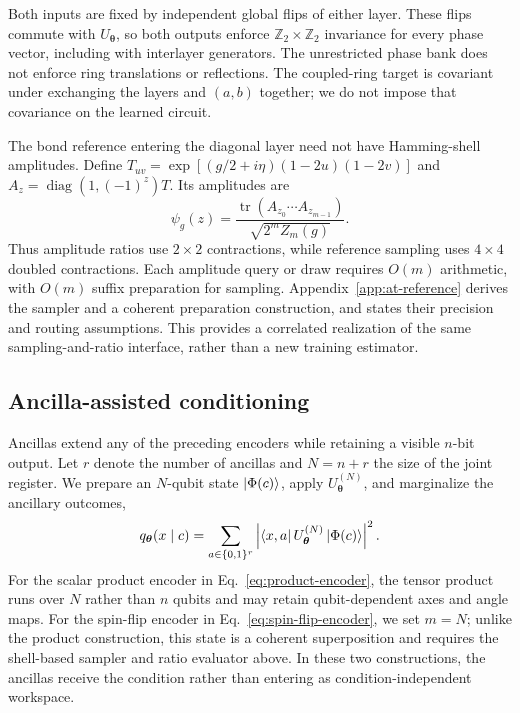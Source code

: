 \documentclass[pra,aps,10pt,twocolumn,floatfix,superscriptaddress,
notitlepage,longbibliography]{revtex4-2}
\begin{document}
Both inputs are fixed by independent global flips of either layer. These flips commute with $U_{\boldsymbol\theta}$, so both outputs enforce $\mathbb Z_2\times\mathbb Z_2$ invariance for every phase vector, including with interlayer generators. The unrestricted phase bank does not enforce ring translations or reflections. The coupled-ring target is covariant under exchanging the layers and $(a,b)$ together; we do not impose that covariance on the learned circuit.

The bond reference entering the diagonal layer need not have Hamming-shell amplitudes. Define $T_{uv}=\exp[(g/2+i\eta)(1-2u)(1-2v)]$ and $A_z=\operatorname{diag}(1,(-1)^z)T$. Its amplitudes are
\begin{equation}
 \psi_g(z)=\frac{\operatorname{tr}(A_{z_0}\cdots A_{z_{m-1}})}{\sqrt{2^m Z_m(g)}}.
 \label{eq:bond-transfer-amplitude}
\end{equation}
Thus amplitude ratios use $2\times2$ contractions, while reference sampling uses $4\times4$ doubled contractions. Each amplitude query or draw requires $O(m)$ arithmetic, with $O(m)$ suffix preparation for sampling. Appendix~\ref{app:at-reference} derives the sampler and a coherent preparation construction, and states their precision and routing assumptions. This provides a correlated realization of the same sampling-and-ratio interface, rather than a new training estimator.

\subsection{Ancilla-assisted conditioning}

Ancillas extend any of the preceding encoders while retaining a visible $n$-bit output. Let $r$ denote the number of ancillas and $N=n+r$ the size of the joint register. We prepare an $N$-qubit state $\ket{\Phi(c)}$, apply $U_{\boldsymbol{\theta}}^{(N)}$, and marginalize the ancillary outcomes,
\begin{equation}
    q_{\boldsymbol{\theta}}(x\mid c)=\sum_{a\in\{0,1\}^{r}}\left|\bra{x,a}U_{\boldsymbol{\theta}}^{(N)}\ket{\Phi(c)}\right|^2.
    \label{eq:ancilla-visible-marginal}
\end{equation}
For the scalar product encoder in Eq.~\eqref{eq:product-encoder}, the tensor product runs over $N$ rather than $n$ qubits and may retain qubit-dependent axes and angle maps. For the spin-flip encoder in Eq.~\eqref{eq:spin-flip-encoder}, we set $m=N$; unlike the product construction, this state is a coherent superposition and requires the shell-based sampler and ratio evaluator above. In these two constructions, the ancillas receive the condition rather than entering as condition-independent workspace.
\end{document}

